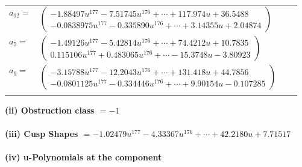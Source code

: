 \documentclass[1p]{elsarticle_modified}
\theoremstyle{definition}
\begin{document}
\begin{tabular}{m{7pt} m{180pt} m{7pt} m{180pt} }
\flushright $a_{12}=$&$\begin{pmatrix}-1.88497 u^{177}-7.51745 u^{176}+\cdots+117.974 u+36.5488\\-0.0838975 u^{177}-0.335890 u^{176}+\cdots+3.14355 u+2.04874\end{pmatrix}$ \\
\flushright $a_{5}=$&$\begin{pmatrix}-1.49126 u^{177}-5.42814 u^{176}+\cdots+74.4212 u+10.7835\\0.115106 u^{177}+0.483065 u^{176}+\cdots-15.3748 u-3.80923\end{pmatrix}$ \\
\flushright $a_{9}=$&$\begin{pmatrix}-3.15788 u^{177}-12.2043 u^{176}+\cdots+131.418 u+44.7856\\-0.0801125 u^{177}-0.334446 u^{176}+\cdots+9.90154 u-0.107285\end{pmatrix}$\\&\end{tabular}
\flushleft \textbf{(ii) Obstruction class $= -1$}\\~\\
\flushleft \textbf{(iii) Cusp Shapes $= -1.02479 u^{177}-4.33367 u^{176}+\cdots+42.2180 u+7.71517$}\\~\\
\newpage\renewcommand{\arraystretch}{1}
\flushleft \textbf{(iv) u-Polynomials at the component}\newline \\
\end{document}
